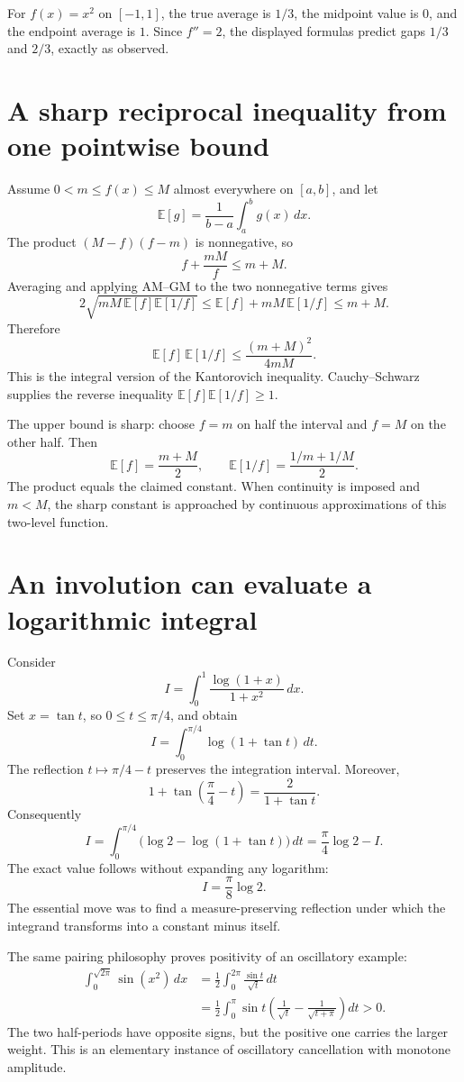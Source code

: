 For \(f(x)=x^2\) on \([-1,1]\), the true average is \(1/3\), the midpoint value is \(0\), and the endpoint average is \(1\). Since \(f''=2\), the displayed formulas predict gaps \(1/3\) and \(2/3\), exactly as observed.

\section{A sharp reciprocal inequality from one pointwise bound}

Assume \(0<m\le f(x)\le M\) almost everywhere on \([a,b]\), and let
\[
 \mathbb E[g]=\frac1{b-a}\int_a^b g(x)\,dx.
\]
The product \((M-f)(f-m)\) is nonnegative, so
\[
 f+\frac{mM}{f}\le m+M.
\]
Averaging and applying AM--GM to the two nonnegative terms gives
\[
 2\sqrt{mM\,\mathbb E[f]\mathbb E[1/f]}
 \le \mathbb E[f]+mM\,\mathbb E[1/f]\le m+M.
\]
Therefore
\[
 \boxed{\mathbb E[f]\,\mathbb E[1/f]
 \le\frac{(m+M)^2}{4mM}.}
\]
This is the integral version of the Kantorovich inequality. Cauchy--Schwarz supplies the reverse inequality \(\mathbb E[f]\mathbb E[1/f]\ge1\).

The upper bound is sharp: choose \(f=m\) on half the interval and \(f=M\) on the other half. Then
\[
 \mathbb E[f]=\frac{m+M}2,\qquad
 \mathbb E[1/f]=\frac{1/m+1/M}2.
\]
The product equals the claimed constant. When continuity is imposed and \(m<M\), the sharp constant is approached by continuous approximations of this two-level function.

\section{An involution can evaluate a logarithmic integral}

Consider
\[
 I=\int_0^1\frac{\log(1+x)}{1+x^2}\,dx.
\]
Set \(x=\tan t\), so \(0\le t\le\pi/4\), and obtain
\[
 I=\int_0^{\pi/4}\log(1+\tan t)\,dt.
\]
The reflection \(t\mapsto\pi/4-t\) preserves the integration interval. Moreover,
\[
 1+\tan\left(\frac\pi4-t\right)=\frac{2}{1+\tan t}.
\]
Consequently
\[
 I=\int_0^{\pi/4}
 \bigl(\log2-\log(1+\tan t)\bigr)\,dt
 =\frac\pi4\log2-I.
\]
The exact value follows without expanding any logarithm:
\[
 \boxed{I=\frac\pi8\log2.}
\]
The essential move was to find a measure-preserving reflection under which the integrand transforms into a constant minus itself.

The same pairing philosophy proves positivity of an oscillatory example:
\[
 \begin{aligned}
 \int_0^{\sqrt{2\pi}}\sin(x^2)\,dx
 &=\frac12\int_0^{2\pi}\frac{\sin t}{\sqrt t}\,dt\\
 &=\frac12\int_0^\pi\sin t
   \left(\frac1{\sqrt t}-\frac1{\sqrt{t+\pi}}\right)dt>0.
 \end{aligned}
\]
The two half-periods have opposite signs, but the positive one carries the larger weight. This is an elementary instance of oscillatory cancellation with monotone amplitude.

